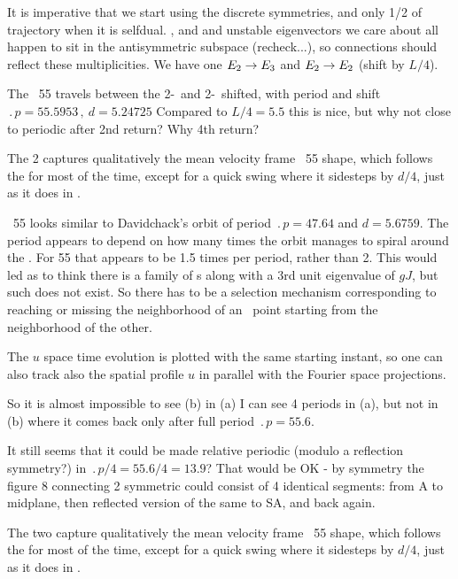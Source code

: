 It is imperative that we start using the discrete symmetries, and only 1/2
of trajectory when it is selfdual.
,  and  and unstable eigenvectors
we care about all happen to sit in the antisymmetric subspace
(recheck...), so connections should reflect these multiplicities. We have
one $E_{2} \to E_{3}$ and $E_{2} \to E_{2}$ (shift by $L/4$).

The \rpo\ {\nameit}55 travels between the 2-\eqv\  and
2-\eqv\ shifted,
with period and shift
$\period{p}=55.5953\,,\ d=5.24725$
Compared to $L/4 = 5.5$
this is nice, but why not close to periodic after 2nd return? Why 4th return?

The {\nameit}2 {\eqv}
captures qualitatively the mean velocity frame \rpo\ {\nameit}55 shape,
which follows the
{\eqv} for most of the time, except for a quick swing where it
sidesteps by $d/4$, just as it does in .

\Rpo\ {\nameit}55 looks similar to Davidchack's  orbit
of period
$\period{p}=47.64$ and $d=5.6759$. The period appears to depend on how
many times the orbit manages to spiral around the \eqv.
For {\nameit}55 that appears to be
1.5 times per period, rather than 2. This would led as
to
think there is a family of \rpo s along with a 3rd unit eigenvalue of
$gJ$,
but such does not exist.
So there has to be a selection mechanism corresponding to
reaching or missing the neighborhood of an \eqv\  point starting from
the neighborhood of the other.

The $u$ space time evolution  %
is plotted with the same starting instant,
so one can also track also the spatial profile $u$ in parallel with
the Fourier space projections.

So it is almost impossible to see (b) %
in (a) %
I can see 4 periods in (a), %
but not in (b) %
where it comes back only after full period $\period{p}=55.6$.

It still seems that it could be made relative periodic
(modulo a reflection symmetry?)
in $\period{p}/4=55.6/4=13.9$? That would be OK
-
by symmetry the figure 8 connecting
2 symmetric {\eqva} could consist of 4 identical segments: from
{\eqv} A to midplane, then reflected version of the same to SA, and
back again.

The two {\eqva}
capture qualitatively the mean velocity frame \rpo\ {\nameit}55 shape,
which follows the
{\eqv} for most of the time, except for a quick swing where it
sidesteps by $d/4$, just as it does in .


